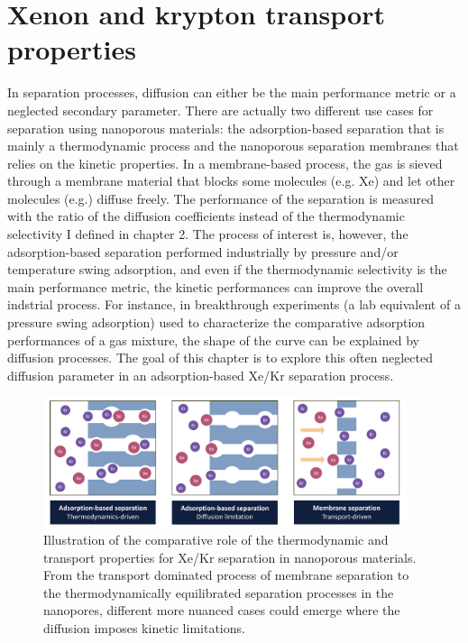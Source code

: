 \documentclass[main]{subfiles}
\begin{document}
\chapter{Xenon and krypton transport properties}
\vspace*{-1\baselineskip}


In separation processes, diffusion can either be the main performance metric or a neglected secondary parameter. There are actually two different use cases for separation using nanoporous materials: the adsorption-based separation that is mainly a thermodynamic process and the nanoporous separation membranes that relies on the kinetic properties. In a membrane-based process, the gas is sieved through a membrane material that blocks some molecules (e.g. Xe) and let other molecules (e.g.) diffuse freely. The performance of the separation is measured with the ratio of the diffusion coefficients instead of the thermodynamic selectivity I defined in chapter 2. The process of interest is, however, the adsorption-based separation performed industrially by pressure and/or temperature swing adsorption, and even if the thermodynamic selectivity is the main performance metric, the kinetic performances can improve the overall indstrial process.\autocite{Kumar_1994} For instance, in breakthrough experiments (a lab equivalent of a pressure swing adsorption) used to characterize the comparative adsorption performances of a gas mixture, the shape of the curve can be explained by diffusion processes. The goal of this chapter is to explore this often neglected diffusion parameter in an adsorption-based Xe/Kr separation process.

\begin{figure}[ht]
  \centering
    \includegraphics[width=0.95\textwidth]{figures/5-diffusion/Diffusion.pdf}
    \caption{Illustration of the comparative role of the thermodynamic and transport properties for Xe/Kr separation in nanoporous materials. From the transport dominated process of membrane separation to the thermodynamically equilibrated separation processes in the nanopores, different more nuanced cases could emerge where the diffusion imposes kinetic limitations.}
    \label{fgr:intro_diffusion}
\end{figure}
\end{document}
